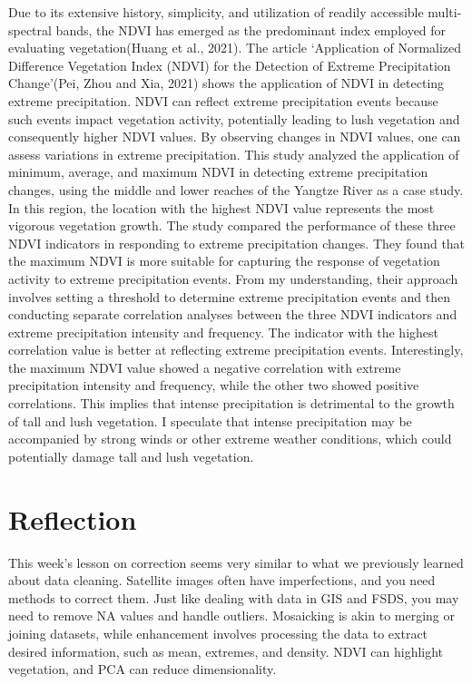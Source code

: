 \documentclass[
  letterpaper,
  DIV=11,
  numbers=noendperiod]{scrreprt}
\begin{document}
Due to its extensive history, simplicity, and utilization of readily
accessible multi-spectral bands, the NDVI has emerged as the predominant
index employed for evaluating vegetation(Huang et al., 2021). The
article `Application of Normalized Difference Vegetation Index (NDVI)
for the Detection of Extreme Precipitation Change'(Pei, Zhou and Xia,
2021) shows the application of NDVI in detecting extreme precipitation.
NDVI can reflect extreme precipitation events because such events impact
vegetation activity, potentially leading to lush vegetation and
consequently higher NDVI values. By observing changes in NDVI values,
one can assess variations in extreme precipitation. This study analyzed
the application of minimum, average, and maximum NDVI in detecting
extreme precipitation changes, using the middle and lower reaches of the
Yangtze River as a case study. In this region, the location with the
highest NDVI value represents the most vigorous vegetation growth. The
study compared the performance of these three NDVI indicators in
responding to extreme precipitation changes. They found that the maximum
NDVI is more suitable for capturing the response of vegetation activity
to extreme precipitation events. From my understanding, their approach
involves setting a threshold to determine extreme precipitation events
and then conducting separate correlation analyses between the three NDVI
indicators and extreme precipitation intensity and frequency. The
indicator with the highest correlation value is better at reflecting
extreme precipitation events. Interestingly, the maximum NDVI value
showed a negative correlation with extreme precipitation intensity and
frequency, while the other two showed positive correlations. This
implies that intense precipitation is detrimental to the growth of tall
and lush vegetation. I speculate that intense precipitation may be
accompanied by strong winds or other extreme weather conditions, which
could potentially damage tall and lush vegetation.

\hypertarget{reflection-1}{%
\section{Reflection}\label{reflection-1}}

This week's lesson on correction seems very similar to what we
previously learned about data cleaning. Satellite images often have
imperfections, and you need methods to correct them. Just like dealing
with data in GIS and FSDS, you may need to remove NA values and handle
outliers. Mosaicking is akin to merging or joining datasets, while
enhancement involves processing the data to extract desired information,
such as mean, extremes, and density. NDVI can highlight vegetation, and
PCA can reduce dimensionality.
\end{document}
